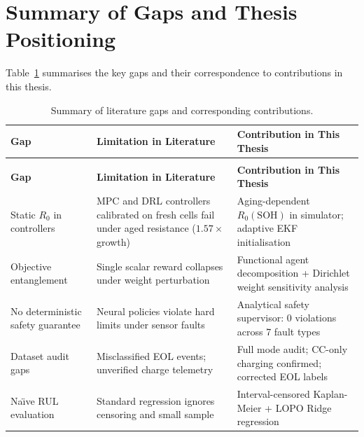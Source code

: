 \section{Summary of Gaps and Thesis Positioning}

Table~\ref{tab:lit_gaps} summarises the key gaps and their
correspondence to contributions in this thesis.

\begin{longtable}{>{\raggedright}p{4cm}
                  >{\raggedright}p{4.5cm}
                  >{\raggedright\arraybackslash}p{4cm}}
\caption{Summary of literature gaps and corresponding contributions.}
\label{tab:lit_gaps}\\
\toprule
\textbf{Gap} & \textbf{Limitation in Literature} &
\textbf{Contribution in This Thesis} \\
\midrule
\endfirsthead
\multicolumn{3}{c}{\tablename\ \thetable\ -- \textit{Continued}}\\
\toprule
\textbf{Gap} & \textbf{Limitation in Literature} &
\textbf{Contribution in This Thesis} \\
\midrule
\endhead
\bottomrule
\endfoot
Static $R_0$ in controllers &
MPC and DRL controllers calibrated on fresh cells fail under aged
resistance ($1.57\times$ growth) &
Aging-dependent $R_0(\mathrm{SOH})$ in simulator; adaptive EKF
initialisation \\[4pt]
Objective entanglement &
Single scalar reward collapses under weight perturbation &
Functional agent decomposition + Dirichlet weight sensitivity analysis
\\[4pt]
No deterministic safety guarantee &
Neural policies violate hard limits under sensor faults &
Analytical safety supervisor: 0 violations across 7 fault types \\[4pt]
Dataset audit gaps &
Misclassified EOL events; unverified charge telemetry &
Full mode audit; CC-only charging confirmed; corrected EOL labels \\[4pt]
Na\"{\i}ve RUL evaluation &
Standard regression ignores censoring and small sample &
Interval-censored Kaplan-Meier + LOPO Ridge regression \\
\end{longtable}
